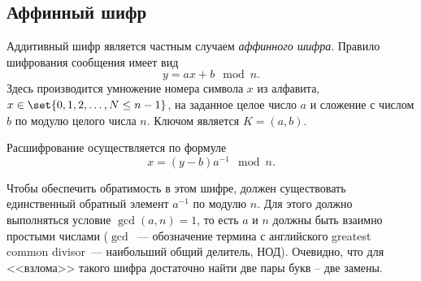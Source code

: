 \subsection{Аффинный шифр}\label{section-affine-cipher}

Аддитивный шифр является частным случаем \emph{аффинного шифра}. Правило шифрования сообщения имеет вид
    \[ y = a x + b \mod n. \]
Здесь производится умножение номера символа $x$ из алфавита, $x\in \set\{ 0, 1, 2, \dots, N \leq n-1 \}$, на заданное целое число $a$ и сложение с числом $b$ по модулю целого числа $n$. Ключом является $K = (a, b)$.

Расшифрование осуществляется по формуле
    \[ x = (y - b) a^{-1} \mod n. \]

Чтобы обеспечить обратимость в этом шифре, должен существовать единственный обратный элемент $a^{-1}$ по модулю $n$. Для этого должно выполняться условие $\gcd(a,n) = 1$, то есть $a$ и $n$ должны быть взаимно простыми числами ($\gcd$~--- обозначение термина с английского greatest common divisor~--- наибольший общий делитель, $\text{НОД}$). Очевидно, что для <<взлома>> такого шифра достаточно найти две пары букв -- две замены.

